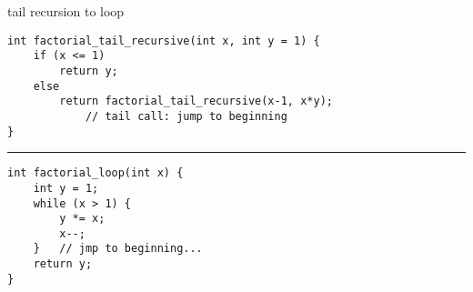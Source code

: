 \begin{frame}[fragile,label=tailToLoop]{tail recursion to loop}
\lstset{language=C++,style=smaller}
\begin{lstlisting}
int factorial_tail_recursive(int x, int y = 1) {
    if (x <= 1)
        return y;
    else
        return factorial_tail_recursive(x-1, x*y);
            // tail call: jump to beginning
}
\end{lstlisting}
\hrule
\begin{lstlisting}
int factorial_loop(int x) {
    int y = 1;
    while (x > 1) {
        y *= x;
        x--;
    }   // jmp to beginning...
    return y;
}
\end{lstlisting}
\end{frame}
